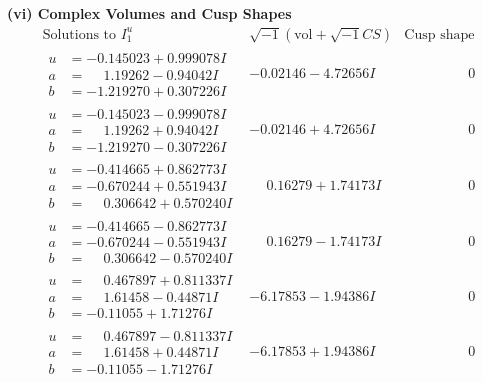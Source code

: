 \documentclass[1p]{elsarticle_modified}
\theoremstyle{definition}
\newcommand{\I}{\sqrt{-1}}
\begin{document}
\newpage\flushleft \textbf{(vi) Complex Volumes and Cusp Shapes}
$$\begin{array}{c|c|c}  
\text{Solutions to }I^u_{1}& \I (\text{vol} + \sqrt{-1}CS) & \text{Cusp shape}\\
 \hline 
\begin{aligned}
u &= -0.145023 + 0.999078 I \\
a &= \phantom{-}1.19262 - 0.94042 I \\
b &= -1.219270 + 0.307226 I\end{aligned}
 & -0.02146 - 4.72656 I & \phantom{-0.000000 } 0 \\ \hline\begin{aligned}
u &= -0.145023 - 0.999078 I \\
a &= \phantom{-}1.19262 + 0.94042 I \\
b &= -1.219270 - 0.307226 I\end{aligned}
 & -0.02146 + 4.72656 I & \phantom{-0.000000 } 0 \\ \hline\begin{aligned}
u &= -0.414665 + 0.862773 I \\
a &= -0.670244 + 0.551943 I \\
b &= \phantom{-}0.306642 + 0.570240 I\end{aligned}
 & \phantom{-}0.16279 + 1.74173 I & \phantom{-0.000000 } 0 \\ \hline\begin{aligned}
u &= -0.414665 - 0.862773 I \\
a &= -0.670244 - 0.551943 I \\
b &= \phantom{-}0.306642 - 0.570240 I\end{aligned}
 & \phantom{-}0.16279 - 1.74173 I & \phantom{-0.000000 } 0 \\ \hline\begin{aligned}
u &= \phantom{-}0.467897 + 0.811337 I \\
a &= \phantom{-}1.61458 - 0.44871 I \\
b &= -0.11055 + 1.71276 I\end{aligned}
 & -6.17853 - 1.94386 I & \phantom{-0.000000 } 0 \\ \hline\begin{aligned}
u &= \phantom{-}0.467897 - 0.811337 I \\
a &= \phantom{-}1.61458 + 0.44871 I \\
b &= -0.11055 - 1.71276 I\end{aligned}
 & -6.17853 + 1.94386 I & \phantom{-0.000000 } 0 \\ \hline\begin{aligned}

\end{aligned}
\end{array}$$
\end{document}
